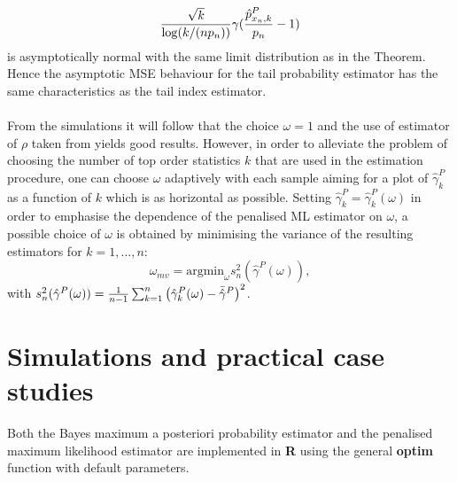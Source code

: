 $${\sqrt{k} \over \log (k/(np_n))}\gamma ( {\hat{p}^{P}_{x_n,k} \over p_n}-1)$$ is asymptotically normal with the same limit distribution as in the Theorem. Hence the asymptotic MSE behaviour for the tail probability estimator has the same characteristics as the tail index estimator.
\\\\
From the simulations it will follow that the choice $\omega =1$ and the use of estimator of $\rho$ taken from \cite{alves2003new} yields good results. However, in order to alleviate the problem of choosing the number of top order statistics $k$ that are used in the estimation procedure, one can choose $\omega$ adaptively with each sample aiming for a plot of $\hat{\gamma}^P_k$ as a function of $k$ which is as horizontal as possible. Setting $\hat{\gamma}_k^P =\hat{\gamma}_k^P (\omega)$ in order to emphasise the dependence of the penalised ML estimator on $\omega$, a possible choice of $\omega$ is obtained by minimising the variance of the resulting estimators for $k=1,\ldots,n$:
\begin{equation}
\omega_{mv} = \mbox{argmin}_{\omega} s^2_n \left(\hat{\gamma}^P (\omega)\right),
\label{minvar}
\end{equation}
with $s^2_n (\hat{\gamma}^P (\omega)) = {1 \over n-1}\sum_{k=1}^n \left( \hat{\gamma}_k^P (\omega) - \bar{\hat{\gamma}}^P\right)^2$.


\section{Simulations and practical case studies}\label{chap3::simulation}

Both the Bayes maximum a posteriori probability estimator and the penalised maximum likelihood estimator are implemented in \textbf{R} using the general \textbf{optim} function with default parameters. 

